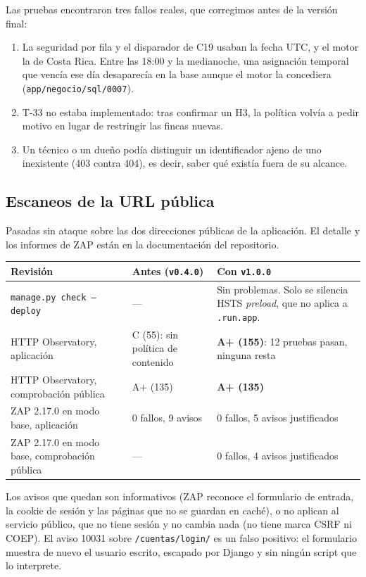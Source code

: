 \documentclass[11pt,letterpaper]{article}
\newcommand{\cab}[1]{\textbf{\rmfamily #1}}
\newcommand{\cod}[1]{\texttt{\small #1}}
\newcommand{\arch}[1]{\texttt{\small #1}}
\begin{document}
Las pruebas encontraron tres fallos reales, que corregimos antes de la versión final:
\begin{enumerate}
  \item La seguridad por fila y el disparador de C19 usaban la fecha UTC, y el motor la de Costa Rica. Entre las 18:00 y la medianoche, una asignación temporal que vencía ese día desaparecía en la base aunque el motor la concediera (\arch{app/negocio/sql/0007}).
  \item T-33 no estaba implementado: tras confirmar un H3, la política volvía a pedir motivo en lugar de restringir las fincas nuevas.
  \item Un técnico o un dueño podía distinguir un identificador ajeno de uno inexistente (403 contra 404), es decir, saber qué existía fuera de su alcance.
\end{enumerate}

\subsection{Escaneos de la URL pública}\label{sec:escaneos}

Pasadas sin ataque sobre las dos direcciones públicas de la aplicación. El detalle y los informes de ZAP están en la documentación del repositorio.

\begin{center}
\footnotesize
\begin{tabularx}{\textwidth}{@{}L{3.6cm} L{3.6cm} Y@{}}
\toprule
\cab{Revisión} & \cab{Antes (\cod{v0.4.0})} & \cab{Con \cod{v1.0.0}} \\
\midrule
\cod{manage.py check --deploy} & — & Sin problemas. Solo se silencia HSTS \emph{preload}, que no aplica a \cod{*.run.app}. \\
HTTP Observatory, aplicación & C (55): sin política de contenido & \textbf{A+ (155)}: 12 pruebas pasan, ninguna resta \\
HTTP Observatory, comprobación pública & A+ (135) & \textbf{A+ (135)} \\
ZAP 2.17.0 en modo base, aplicación & 0 fallos, 9 avisos & 0 fallos, 5 avisos justificados \\
ZAP 2.17.0 en modo base, comprobación pública & — & 0 fallos, 4 avisos justificados \\
\bottomrule
\end{tabularx}
\end{center}

Los avisos que quedan son informativos (ZAP reconoce el formulario de entrada, la cookie de sesión y las páginas que no se guardan en caché), o no aplican al servicio público, que no tiene sesión y no cambia nada (no tiene marca CSRF ni COEP). El aviso 10031 sobre \cod{/cuentas/login/} es un falso
positivo: el formulario muestra de nuevo el usuario escrito, escapado por Django y sin ningún script que lo interprete.
\end{document}
